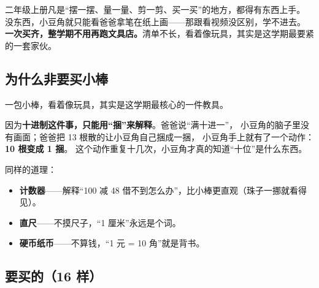 \label{chap:supplies}

\begin{unitinfo}
二年级上册凡是“摆一摆、量一量、剪一剪、买一买”的地方，都得有东西上手。
没东西，小豆角就只能看爸爸拿笔在纸上画——那跟看视频没区别，学不进去。\\
\textbf{一次买齐，整学期不用再跑文具店。}清单不长，看着像玩具，其实是这学期最要紧的一套家伙。
\end{unitinfo}

\subsection{为什么非要买小棒}

一包小棒，看着像玩具，其实是这学期最核心的一件教具。

因为\textbf{十进制这件事，只能用“捆”来解释}。爸爸说“满十进一”，
小豆角的脑子里没有画面；爸爸把 13 根散的让小豆角自己捆成一捆，
小豆角手上就有了一个动作：\textbf{10 根变成 1 捆}。
这个动作重复十几次，小豆角才真的知道“十位”是什么东西。

同样的道理：
\begin{itemize}
  \item \textbf{计数器}——解释“100 减 48 借不到怎么办”，比小棒更直观（珠子一挪就看得见）。
  \item \textbf{直尺}——不摸尺子，“1 厘米”永远是个词。
  \item \textbf{硬币纸币}——不算钱，“1 元 = 10 角”就是背书。
\end{itemize}

\subsection{要买的（16 样）}

